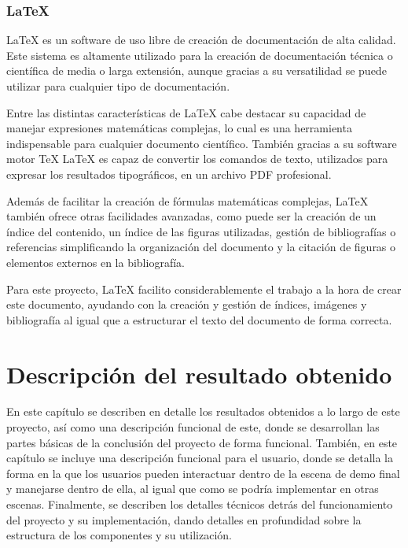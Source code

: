 \documentclass[a4paper, 12pt]{book}
\begin{document}
\subsection{LaTeX}
\label{subsec:latex}

LaTeX \cite{latexproject_about} es un software de uso libre de creación de documentación de alta calidad. Este sistema es altamente utilizado para la creación de documentación técnica o científica de media o larga extensión, aunque gracias a su versatilidad se puede utilizar para cualquier tipo de documentación.

Entre las distintas características de LaTeX cabe destacar su capacidad de manejar expresiones matemáticas complejas, lo cual es una herramienta indispensable para cualquier documento científico. También gracias a su software motor TeX LaTeX es capaz de convertir los comandos de texto, utilizados para expresar los resultados tipográficos, en un archivo PDF profesional. 

Además de facilitar la creación de fórmulas matemáticas complejas, LaTeX también ofrece otras facilidades avanzadas, como puede ser la creación de un índice del contenido, un índice de las figuras utilizadas, gestión de bibliografías o referencias simplificando la organización del documento y la citación de figuras o elementos externos en la bibliografía.

Para este proyecto, LaTeX facilito considerablemente el trabajo a la hora de crear este documento, ayudando con la creación y gestión de índices, imágenes y bibliografía al igual que a estructurar el texto del documento de forma correcta.


\cleardoublepage
\chapter{Descripción del resultado obtenido}
\label{chap:resultados}
En este capítulo se describen en detalle los resultados obtenidos a lo largo de este proyecto, así como una descripción funcional de este, donde se desarrollan las partes básicas de la conclusión del proyecto de forma funcional. También, en este capítulo se incluye una descripción funcional para el usuario, donde se detalla la forma en la que los usuarios pueden interactuar dentro de la escena de demo final y manejarse dentro de ella, al igual que como se podría implementar en otras escenas. Finalmente, se describen los detalles técnicos detrás del funcionamiento del proyecto y su implementación,
dando detalles en profundidad sobre la estructura de los componentes y su utilización.
\end{document}
